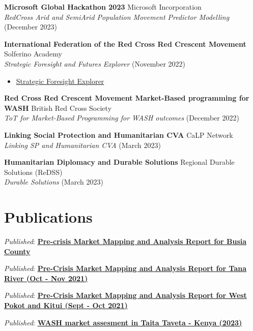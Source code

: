 \documentclass[line,margin,10pt]{res}
\begin{document}
\begin{resume}
\textbf{Microsoft Global Hackathon 2023} \hfill Microsoft Incorporation\\
{\sl RedCross Arid and SemiArid Population Movement Predictor Modelling} \hfill (December 2023)

\textbf{International Federation of the Red Cross Red Crescent Movement} \hfill Solferino Academy\\
{\sl Strategic Foresight and Futures Explorer} \hfill (November 2022)
\begin{itemize} \itemsep -2pt
    \item \href{https://www.virtualbadge.io/certificate-validator?credential=cer-433e718d-cb4c-4c07-9436-1bbb67b6}{Strategic Foresight Explorer}
\end{itemize}
\textbf{Red Cross Red Crescent Movement Market-Based programming for WASH} \hfill British Red Cross Society\\
{\sl ToT for Market-Based Programming for WASH outcomes} \hfill (December 2022)

\textbf{Linking Social Protection and Humanitarian CVA } \hfill CaLP Network\\
{\sl Linking SP and Humanitarian CVA} \hfill (March 2023)

\textbf{Humanitarian Diplomacy and Durable Solutions} \hfill Regional Durable Solutions (ReDSS)\\
{\sl Durable Solutions} \hfill (March 2023)

{\vspace{-0.25cm}}

\section{Publications}
{\sl Published}: \textbf{\href{https://reliefweb.int/node/3935263}{Pre-crisis Market Mapping and Analysis Report for Busia County}}

{\sl Published}: \textbf{\href{https://reliefweb.int/node/3928348}{Pre-Crisis Market Mapping and Analysis Report for Tana River (Oct - Nov 2021)}}

{\sl Published}: \textbf{\href{https://reliefweb.int/node/3928350}{Pre-Crisis Market Mapping and Analysis Report for West Pokot and Kitui (Sept - Oct 2021)}}

{\sl Published}: \textbf{\href{https://www.dropbox.com/s/qs9067pr9a9tok1/2023_WASH Market assessment Taveta report_final.pdf?dl=0}{WASH market assesment in Taita Taveta - Kenya (2023)}}

{\vspace{-0.25cm}}


\end{resume}
\end{document}
